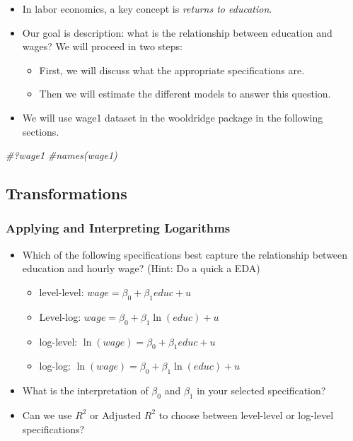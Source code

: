 \documentclass[
]{book}
\newenvironment{Shaded}{\begin{snugshade}}{\end{snugshade}}
\newcommand{\CommentTok}[1]{\textcolor[rgb]{0.56,0.35,0.01}{\textit{#1}}}
\providecommand{\tightlist}{%
  \setlength{\itemsep}{0pt}\setlength{\parskip}{0pt}}
\theoremstyle{definition}
\theoremstyle{definition}
\theoremstyle{definition}
\theoremstyle{definition}
\theoremstyle{remark}
\begin{document}
\begin{itemize}
\tightlist
\item
  In labor economics, a key concept is \emph{returns to education}.\\
\item
  Our goal is description: what is the relationship between education and wages? We will proceed in two steps:

  \begin{itemize}
  \tightlist
  \item
    First, we will discuss what the appropriate specifications are.
  \item
    Then we will estimate the different models to answer this question.
  \end{itemize}
\item
  We will use wage1 dataset in the wooldridge package in the following sections.
\end{itemize}

\begin{Shaded}
\begin{Highlighting}[]
\CommentTok{\#?wage1}
\CommentTok{\#names(wage1)}
\end{Highlighting}
\end{Shaded}

\hypertarget{transformations}{%
\subsection{Transformations}\label{transformations}}

\hypertarget{applying-and-interpreting-logarithms}{%
\subsubsection{Applying and Interpreting Logarithms}\label{applying-and-interpreting-logarithms}}

\begin{itemize}
\item
  Which of the following specifications best capture the relationship between education and hourly wage? (Hint: Do a quick a EDA)

  \begin{itemize}
  \tightlist
  \item
    level-level: \(wage = \beta_0 + \beta_1 educ + u\)
  \item
    Level-log: \(wage = \beta_0 + \beta_1 \ln(educ) + u\)
  \item
    log-level: \(\ln(wage) = \beta_0 + \beta_1 educ + u\)
  \item
    log-log: \(\ln(wage) = \beta_0 + \beta_1 \ln(educ) + u\)
  \end{itemize}
\item
  What is the interpretation of \(\beta_0\) and \(\beta_1\) in your selected specification?
\item
  Can we use \(R^2\) or Adjusted \(R^2\) to choose between level-level or log-level specifications?
\end{itemize}
\end{document}
